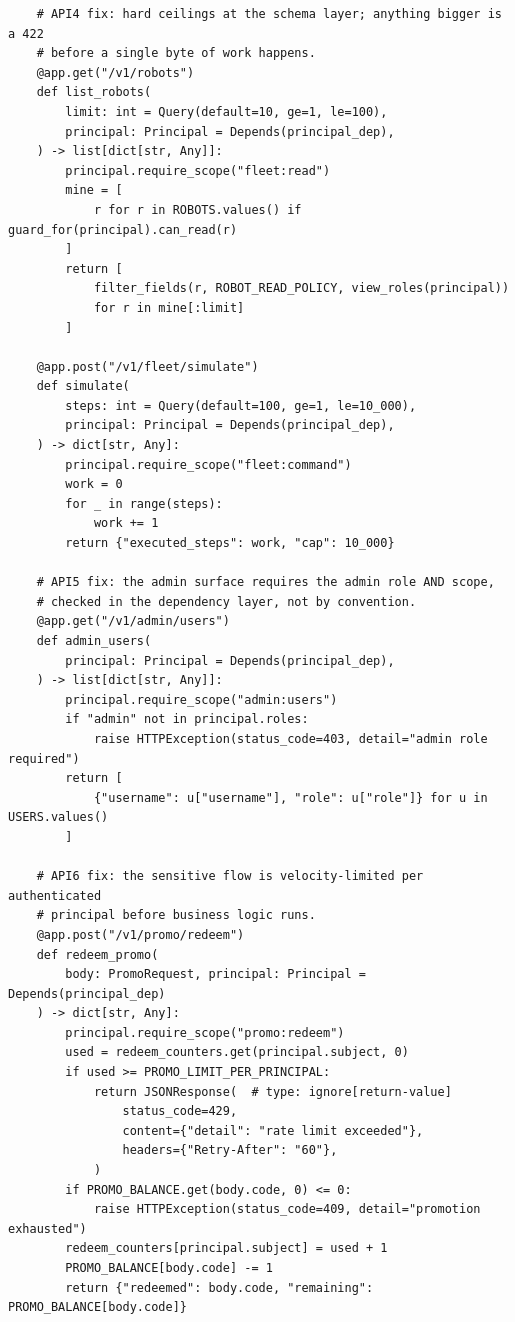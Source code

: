 \begin{verbatim}
    # API4 fix: hard ceilings at the schema layer; anything bigger is a 422
    # before a single byte of work happens.
    @app.get("/v1/robots")
    def list_robots(
        limit: int = Query(default=10, ge=1, le=100),
        principal: Principal = Depends(principal_dep),
    ) -> list[dict[str, Any]]:
        principal.require_scope("fleet:read")
        mine = [
            r for r in ROBOTS.values() if guard_for(principal).can_read(r)
        ]
        return [
            filter_fields(r, ROBOT_READ_POLICY, view_roles(principal))
            for r in mine[:limit]
        ]

    @app.post("/v1/fleet/simulate")
    def simulate(
        steps: int = Query(default=100, ge=1, le=10_000),
        principal: Principal = Depends(principal_dep),
    ) -> dict[str, Any]:
        principal.require_scope("fleet:command")
        work = 0
        for _ in range(steps):
            work += 1
        return {"executed_steps": work, "cap": 10_000}

    # API5 fix: the admin surface requires the admin role AND scope,
    # checked in the dependency layer, not by convention.
    @app.get("/v1/admin/users")
    def admin_users(
        principal: Principal = Depends(principal_dep),
    ) -> list[dict[str, Any]]:
        principal.require_scope("admin:users")
        if "admin" not in principal.roles:
            raise HTTPException(status_code=403, detail="admin role required")
        return [
            {"username": u["username"], "role": u["role"]} for u in USERS.values()
        ]

    # API6 fix: the sensitive flow is velocity-limited per authenticated
    # principal before business logic runs.
    @app.post("/v1/promo/redeem")
    def redeem_promo(
        body: PromoRequest, principal: Principal = Depends(principal_dep)
    ) -> dict[str, Any]:
        principal.require_scope("promo:redeem")
        used = redeem_counters.get(principal.subject, 0)
        if used >= PROMO_LIMIT_PER_PRINCIPAL:
            return JSONResponse(  # type: ignore[return-value]
                status_code=429,
                content={"detail": "rate limit exceeded"},
                headers={"Retry-After": "60"},
            )
        if PROMO_BALANCE.get(body.code, 0) <= 0:
            raise HTTPException(status_code=409, detail="promotion exhausted")
        redeem_counters[principal.subject] = used + 1
        PROMO_BALANCE[body.code] -= 1
        return {"redeemed": body.code, "remaining": PROMO_BALANCE[body.code]}


\end{verbatim}
